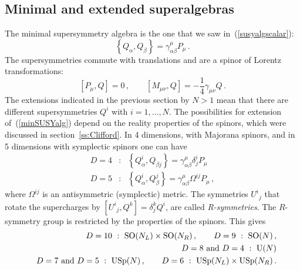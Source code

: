 \documentclass[a4paper,11pt,twoside]{article}
\newcommand{\OliveGreen}[1]{#1}
\newcommand{\Blue}[1]{#1}
\newcommand{\ft}[2]{{\textstyle\frac{#1}{#2}}}
\newcommand{\SO}{\mathop{\rm SO}}
\newcommand{\U}{\mathop{\rm {}U}}
\newcommand{\USp}{\mathop{\rm {}USp}}
\begin{document}
\subsection{Minimal and extended superalgebras}
The minimal supersymmetry algebra is the one that we saw
in~(\ref{susyalgscalar}):
\begin{equation}
  \left\{ \Blue{Q_\alpha },\Blue{Q_\beta }\right\} =
  \gamma ^\mu _{\alpha \beta }\OliveGreen{P_\mu
  }\,.
 \label{minSUSYalg}
\end{equation}
The supersymmetries commute with translations and are a spinor of Lorentz
transformations:
\begin{equation}
 \left[  \OliveGreen{P_\mu },\Blue{Q}\right] =0\,,\qquad
 \left[\OliveGreen{M_{\mu \nu }},\Blue{Q}\right] =-\ft14\gamma _{\mu \nu
 }\Blue{Q}\,.
 \label{QPQM}
\end{equation}
The extensions indicated in the previous section by $N>1$ mean that there
are different supersymmetries $Q^i$ with $i=1,\ldots ,N$. The
possibilities for extension of~(\ref{minSUSYalg}) depend on the reality
properties of the spinors, which were discussed in
section~\ref{ss:Clifford}. In 4 dimensions, with Majorana spinors, and in
5 dimensions with symplectic spinors one can have
\begin{eqnarray}
D=4&:&  \left\{ \Blue{Q_\alpha^i},\Blue{Q_{\beta j}}\right\} =\gamma ^\mu
_{\alpha \beta }\delta ^i_j\OliveGreen{P_\mu
  }\nonumber\\
D=5&:&\left\{ \Blue{Q_\alpha^i},\Blue{Q_\beta ^j}\right\} =\gamma ^\mu
_{\alpha \beta }\Omega ^{ij}\OliveGreen{P_\mu }\,,
 \label{extSUSY45}
\end{eqnarray}
where $\Omega ^{ij}$ is an antisymmetric (symplectic) metric. The
symmetries $\OliveGreen{U}^i{}_j$ that rotate the supercharges by $\left[
\OliveGreen{U}^i{}_j,\Blue{Q}^k\right] =\delta ^k_j\Blue{Q}^i$, are
called \emph{R-symmetries}. The $R$-symmetry group is restricted by the
properties of the spinors. This gives
\begin{eqnarray}
 &&D=10\ :\ \SO(N_L)\times \SO(N_R)\,,\qquad D=9\ :\ \SO(N)\,,\nonumber\\
&& D=8\mbox{ and }D=4\ :\ \U(N)\label{Rsymmetry} \\
  & & D=7\mbox{ and }D=5\ :\ \USp(N)\,,\qquad D=6\ :\ \USp(N_L)\times
  \USp(N_R)\,.\nonumber
\end{eqnarray}
\end{document}
